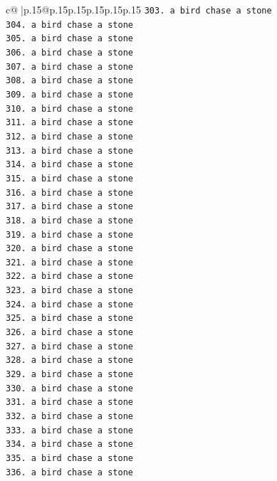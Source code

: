 \documentclass{article}
\begin{document}
{\begin{supertabular}{c@{$\;$}|p{.15\linewidth}@{}p{.15\linewidth}p{.15\linewidth}p{.15\linewidth}p{.15\linewidth}p{.15\linewidth}}
{{{\texttt{303. a bird chase a stone} \\
\texttt{304. a bird chase a stone} \\
\texttt{305. a bird chase a stone} \\
\texttt{306. a bird chase a stone} \\
\texttt{307. a bird chase a stone} \\
\texttt{308. a bird chase a stone} \\
\texttt{309. a bird chase a stone} \\
\texttt{310. a bird chase a stone} \\
\texttt{311. a bird chase a stone} \\
\texttt{312. a bird chase a stone} \\
\texttt{313. a bird chase a stone} \\
\texttt{314. a bird chase a stone} \\
\texttt{315. a bird chase a stone} \\
\texttt{316. a bird chase a stone} \\
\texttt{317. a bird chase a stone} \\
\texttt{318. a bird chase a stone} \\
\texttt{319. a bird chase a stone} \\
\texttt{320. a bird chase a stone} \\
\texttt{321. a bird chase a stone} \\
\texttt{322. a bird chase a stone} \\
\texttt{323. a bird chase a stone} \\
\texttt{324. a bird chase a stone} \\
\texttt{325. a bird chase a stone} \\
\texttt{326. a bird chase a stone} \\
\texttt{327. a bird chase a stone} \\
\texttt{328. a bird chase a stone} \\
\texttt{329. a bird chase a stone} \\
\texttt{330. a bird chase a stone} \\
\texttt{331. a bird chase a stone} \\
\texttt{332. a bird chase a stone} \\
\texttt{333. a bird chase a stone} \\
\texttt{334. a bird chase a stone} \\
\texttt{335. a bird chase a stone} \\
\texttt{336. a bird chase a stone} \\
}}}
\end{supertabular}}
\end{document}
